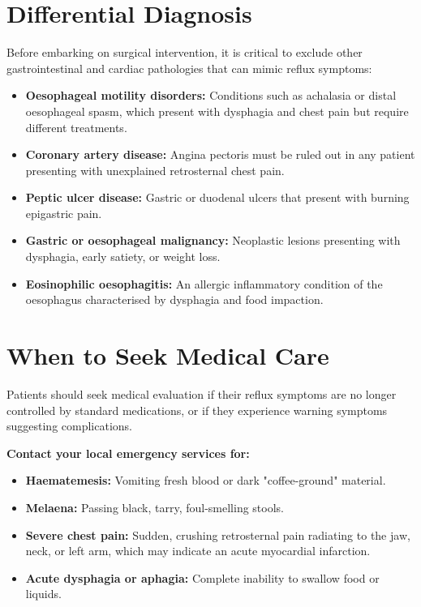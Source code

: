 \section*{Differential Diagnosis}
Before embarking on surgical intervention, it is critical to exclude other gastrointestinal and cardiac pathologies that can mimic reflux symptoms:
\begin{itemize}
    \item \textbf{Oesophageal motility disorders:} Conditions such as achalasia or distal oesophageal spasm, which present with dysphagia and chest pain but require different treatments.
    \item \textbf{Coronary artery disease:} Angina pectoris must be ruled out in any patient presenting with unexplained retrosternal chest pain.
    \item \textbf{Peptic ulcer disease:} Gastric or duodenal ulcers that present with burning epigastric pain.
    \item \textbf{Gastric or oesophageal malignancy:} Neoplastic lesions presenting with dysphagia, early satiety, or weight loss.
    \item \textbf{Eosinophilic oesophagitis:} An allergic inflammatory condition of the oesophagus characterised by dysphagia and food impaction.
\end{itemize}

\section*{When to Seek Medical Care}
Patients should seek medical evaluation if their reflux symptoms are no longer controlled by standard medications, or if they experience warning symptoms suggesting complications.

\textbf{Contact your local emergency services for:}
\begin{itemize}
    \item \textbf{Haematemesis:} Vomiting fresh blood or dark "coffee-ground" material.
    \item \textbf{Melaena:} Passing black, tarry, foul-smelling stools.
    \item \textbf{Severe chest pain:} Sudden, crushing retrosternal pain radiating to the jaw, neck, or left arm, which may indicate an acute myocardial infarction.
    \item \textbf{Acute dysphagia or aphagia:} Complete inability to swallow food or liquids.
\end{itemize}

